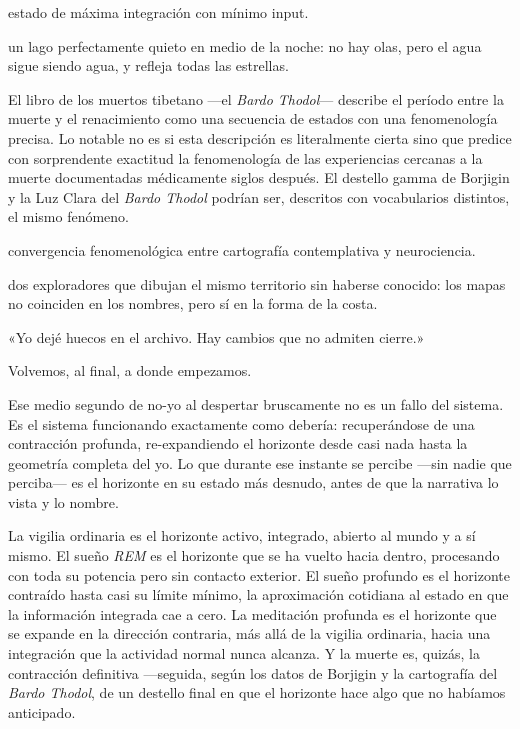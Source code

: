 \begin{fisica}
 estado de máxima integración con mínimo input.

 un lago perfectamente quieto en medio de la noche: no hay olas, pero el agua sigue siendo agua, y refleja todas las estrellas.
\end{fisica}
El libro de los muertos tibetano —el \emph{Bardo Thodol}— describe el período entre la muerte y el renacimiento como una secuencia de estados con una fenomenología precisa. Lo notable no es si esta descripción es literalmente cierta sino que predice con sorprendente exactitud la fenomenología de las experiencias cercanas a la muerte documentadas médicamente siglos después. El destello gamma de Borjigin y la Luz Clara del \emph{Bardo Thodol} podrían ser, descritos con vocabularios distintos, el mismo fenómeno.

\begin{fisica}
 convergencia fenomenológica entre cartografía contemplativa y neurociencia.

 dos exploradores que dibujan el mismo territorio sin haberse conocido: los mapas no coinciden en los nombres, pero sí en la forma de la costa.
\end{fisica}
\begin{cita}
«Yo dejé huecos en el archivo. Hay cambios que no admiten cierre.»
\end{cita}
\noindent Volvemos, al final, a donde empezamos.

Ese medio segundo de no-yo al despertar bruscamente no es un fallo del sistema. Es el sistema funcionando exactamente como debería: recuperándose de una contracción profunda, re-expandiendo el horizonte desde casi nada hasta la geometría completa del yo. Lo que durante ese instante se percibe —sin nadie que perciba— es el horizonte en su estado más desnudo, antes de que la narrativa lo vista y lo nombre.

La vigilia ordinaria es el horizonte activo, integrado, abierto al mundo y a sí mismo. El sueño \emph{REM} es el horizonte que se ha vuelto hacia dentro, procesando con toda su potencia pero sin contacto exterior. El sueño profundo es el horizonte contraído hasta casi su límite mínimo, la aproximación cotidiana al estado en que la información integrada cae a cero. La meditación profunda es el horizonte que se expande en la dirección contraria, más allá de la vigilia ordinaria, hacia una integración que la actividad normal nunca alcanza. Y la muerte es, quizás, la contracción definitiva —seguida, según los datos de Borjigin y la cartografía del \emph{Bardo Thodol}, de un destello final en que el horizonte hace algo que no habíamos anticipado.

